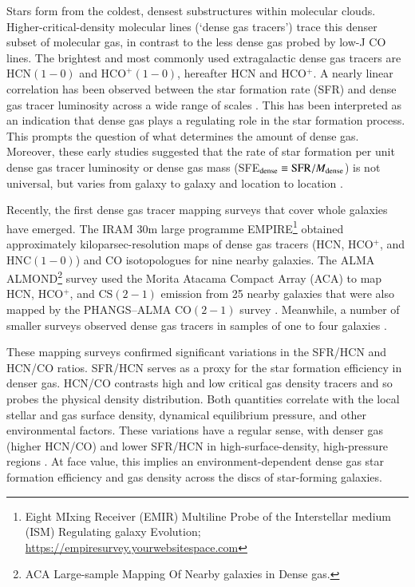 \documentclass[letter, longauth]{aa} %
\newcommand*{\hcnone}{\ensuremath{\mathrm{HCN(1-0)}}\xspace} %
\newcommand*{\hcopone}{\ensuremath{\text{HCO}^+\mathrm{(1-0)}}\xspace} %
\newcommand*{\hncone}{\ensuremath{\mathrm{HNC(1-0)}}\xspace} %
\newcommand*{\cstwo}{\ensuremath{\mathrm{CS(2-1)}}\xspace} %
\newcommand*{\cotwo}{\ensuremath{\mathrm{CO(2-1)}}\xspace} %
\begin{document}
Stars form from the coldest, densest substructures within molecular clouds. 
Higher-critical-density molecular lines (`dense gas tracers') trace this denser subset of molecular gas, in contrast to the less dense gas probed by low-J CO lines.
The brightest and most commonly used extragalactic dense gas tracers are \hcnone and \hcopone, hereafter HCN and HCO$^+$. A nearly linear correlation has been observed between the star formation rate (SFR) and dense gas tracer luminosity across a wide range of scales \citep[e.g.][]{Gao2004, Wu2010, Garcia-Burillo2012, Usero2015, Chen2017}. This has been interpreted as an indication that dense gas plays a regulating role in the star formation process. This prompts the question of what determines the amount of dense gas. Moreover, these early studies suggested that the rate of star formation per unit dense gas tracer luminosity or dense gas mass (SFE$_{\rm dense} \equiv {\rm SFR}/M_{\rm dense}$) is not universal, but varies from galaxy to galaxy and location to location \citep[][]{Garcia-Burillo2012, Usero2015, Chen2015}.

Recently, the first dense gas tracer mapping surveys that cover whole galaxies have emerged. The IRAM 30m large programme EMPIRE\footnote{Eight MIxing Receiver (EMIR) Multiline Probe of the Interstellar medium (ISM) Regulating galaxy Evolution; \url{https://empiresurvey.yourwebsitespace.com}} \citep[][]{Bigiel2016, Jimenez-Donaire2017, Jimenez-Donaire2019} obtained approximately kiloparsec-resolution maps of dense gas tracers (HCN, HCO$^+$, and \hncone) and CO isotopologues for nine nearby galaxies. The ALMA ALMOND\footnote{ACA Large-sample Mapping Of Nearby galaxies in Dense gas.} survey \citep{Neumann2023a} used the Morita Atacama Compact Array (ACA) to map HCN, HCO$^+$, and \cstwo emission from 25 nearby galaxies that were also mapped by the PHANGS--ALMA  \cotwo survey \citep{Leroy2021a}. 
Meanwhile, a number of smaller surveys observed dense gas tracers in samples of one to four galaxies \citep[e.g.][]{Tan2018, Gallagher2018a, Gallagher2018b, Querejeta2019, Beslic2021, Heyer2022, Neumann2024, Lin2024}. 

These mapping surveys confirmed significant variations in the SFR/HCN and HCN/CO ratios.
SFR/HCN serves as a proxy for the star formation efficiency in denser gas.
HCN/CO contrasts high and low critical gas density tracers and so probes the physical density distribution. 
Both quantities correlate with the local stellar and gas surface density, dynamical equilibrium pressure, and other environmental factors. 
These variations have a regular sense, with denser gas (higher HCN/CO) and lower SFR/HCN in high-surface-density, high-pressure regions \citep[e.g.][]{Jimenez-Donaire2019}.  
At face value, this implies an environment-dependent dense gas star formation efficiency and gas density across the discs of star-forming galaxies.
\end{document}
